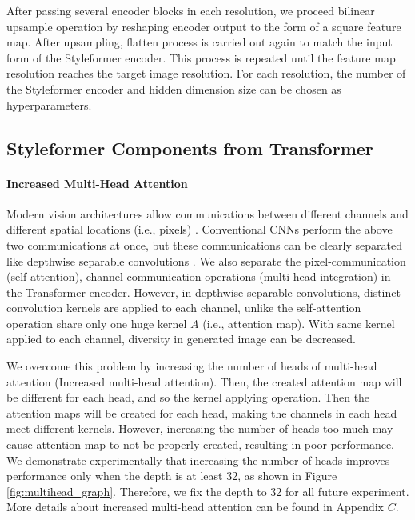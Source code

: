 \documentclass[10pt,twocolumn,letterpaper]{article}
\begin{document}
After passing several encoder blocks in each resolution, we proceed bilinear upsample operation by reshaping encoder output to the form of a square feature map. After upsampling, flatten process is carried out again to match the input form of the Styleformer encoder. This process is repeated until the feature map resolution reaches the target image resolution. For each resolution, the number of the Styleformer encoder and hidden dimension size can be chosen as hyperparameters.





\subsection{Styleformer Components from Transformer}
\label{section:3-2}





\paragraph{Increased Multi-Head Attention}


Modern vision architectures allow communications between different channels and different spatial locations (i.e., pixels) \cite{tolstikhin2021mlpmixer}. Conventional CNNs perform the above two communications at once, but these communications can be clearly separated like depthwise separable convolutions \cite{howard2017mobilenets}. We also separate the pixel-communication (self-attention), channel-communication operations (multi-head integration) in the Transformer encoder. However, in depthwise separable convolutions, distinct convolution kernels are applied to each channel, unlike the self-attention operation share only one huge kernel $A$ (i.e., attention map). With same kernel applied to each channel, diversity in generated image can be decreased.


We overcome this problem by increasing the number of heads of multi-head attention (Increased multi-head attention). Then, the created attention map will be different for each head, and so the kernel applying operation. 
Then the attention maps will be created for each head, making the channels in each head meet different kernels.
However, increasing the number of heads too much may cause attention map to not be properly created, resulting in poor performance.
We demonstrate experimentally that increasing the number of heads improves performance only when the depth is at least 32, as shown in Figure \ref{fig:multihead_graph}. Therefore, we fix the depth to 32 for all future experiment.  More details about increased multi-head attention can be found in Appendix $C$. 
\end{document}
